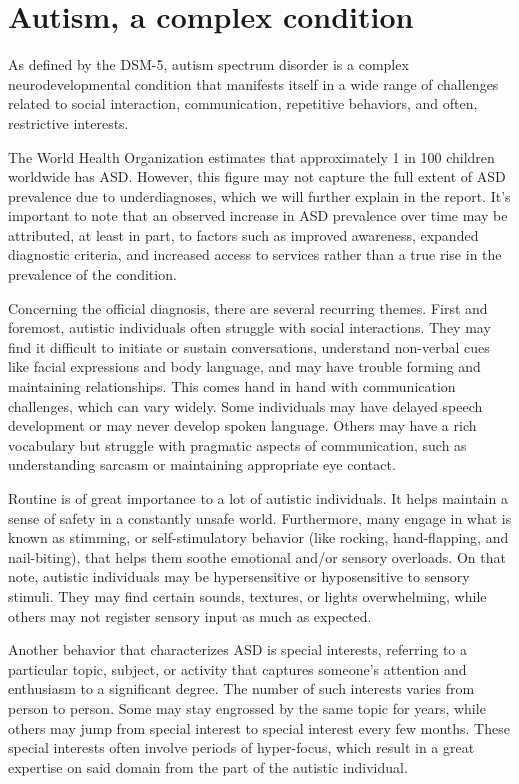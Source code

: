 \section{Autism, a complex condition}

As defined by the DSM-5, autism spectrum disorder is a complex neurodevelopmental condition that manifests itself in a wide range of challenges related to social interaction, communication, repetitive behaviors, and often, restrictive interests.

The World Health Organization estimates that approximately 1 in 100 children worldwide has ASD. However, this figure may not capture the full extent of ASD prevalence due to underdiagnoses, which we will further explain in the report. It's important to note that an observed increase in ASD prevalence over time may be attributed, at least in part, to factors such as improved awareness, expanded diagnostic criteria, and increased access to services rather than a true rise in the prevalence of the condition.

Concerning the official diagnosis, there are several recurring themes. First and foremost, autistic individuals often struggle with social interactions. They may find it difficult to initiate or sustain conversations, understand non-verbal cues like facial expressions and body language, and may have trouble forming and maintaining relationships. This comes hand in hand with communication challenges, which can vary widely. Some individuals may have delayed speech development or may never develop spoken language. Others may have a rich vocabulary but struggle with pragmatic aspects of communication, such as understanding sarcasm or maintaining appropriate eye contact.

Routine is of great importance to a lot of autistic individuals. It helps maintain a sense of safety in a constantly unsafe world. Furthermore, many engage in what is known as stimming, or self-stimulatory behavior (like rocking, hand-flapping, and nail-biting), that helps them soothe emotional and/or sensory overloads. On that note, autistic individuals may be hypersensitive or hyposensitive to sensory stimuli. They may find certain sounds, textures, or lights overwhelming, while others may not register sensory input as much as expected.

Another behavior that characterizes ASD is special interests, referring to a particular topic, subject, or activity that captures someone's attention and enthusiasm to a significant degree. The number of such interests varies from person to person. Some may stay engrossed by the same topic for years, while others may jump from special interest to special interest every few months. These special interests often involve periods of hyper-focus, which result in a great expertise on said domain from the part of the autistic individual.

